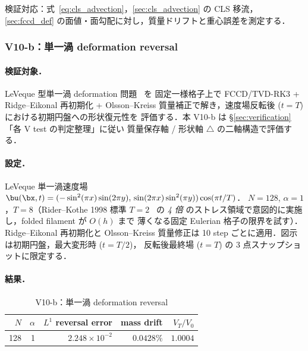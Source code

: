 検証対応：式~\eqref{eq:cls_advection}，\autoref{sec:cls_advection} の CLS 移流，
\autoref{sec:fccd_def} の面値・面勾配に対し，質量ドリフトと重心誤差を測定する．

\FloatBarrier

\subsubsection{V10-b：単一渦 deformation reversal}
\label{sec:single_vortex_reversal}

\paragraph{検証対象．}
LeVeque 型単一渦 deformation 問題~\cite{LeVeque1996,RiderKothe1998} を
固定一様格子上で FCCD/TVD-RK3 + Ridge--Eikonal 再初期化 + Olsson--Kreiss
質量補正で解き，速度場反転後 ($t=T$) における初期円盤への形状復元性を
評価する．本 V10-b は §\ref{sec:verification}「各 V test の判定整理」に従い
質量保存軸 \checkmark / 形状軸 $\triangle$ の二軸構造で評価する．

\paragraph{設定．}
LeVeque 単一渦速度場 $\bu(\bx, t) = (-\sin^2(\pi x)\sin(2\pi y),\,
\sin(2\pi x)\sin^2(\pi y)) \cos(\pi t/T)$．
$N=128$, $\alpha=1$，$T=8$（Rider--Kothe 1998 標準 $T=2$~\cite{RiderKothe1998,LeVeque1996}
の \emph{4 倍} のストレス領域で意図的に実施し，folded filament が $O(h)$ まで
薄くなる固定 Eulerian 格子の限界を試す）．Ridge--Eikonal 再初期化と
Olsson--Kreiss 質量修正は 10 step ごとに適用．図示は初期円盤，最大変形時 ($t=T/2$)，
反転後最終場 ($t=T$) の 3 点スナップショットに限定する．

\paragraph{結果．}
\begin{table}[!htbp]
\caption{V10-b：単一渦 deformation reversal}
\label{tab:V10_single_vortex}
\centering\small
\begin{tabular}{r r r r r}
\toprule
$N$ & $\alpha$ & $L^1$ reversal error & mass drift & $V_T/V_0$ \\
\midrule
128 & 1 & $2.248\times 10^{-2}$ & $0.0428\%$ & $1.0004$ \\
\bottomrule
\end{tabular}
\end{table}

